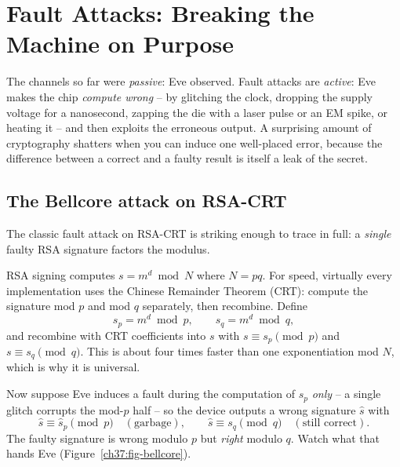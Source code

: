 \section{Fault Attacks: Breaking the Machine on Purpose}
\label{ch37:fault}

The channels so far were \emph{passive}: Eve observed. Fault attacks are \emph{active}: Eve makes the chip \emph{compute wrong} -- by glitching the clock, dropping the supply voltage for a nanosecond, zapping the die with a laser pulse or an EM spike, or heating it -- and then exploits the erroneous output. A surprising amount of cryptography shatters when you can induce one well-placed error, because the difference between a correct and a faulty result is itself a leak of the secret.

\subsection{The Bellcore attack on RSA-CRT}
\label{ch37:bellcore}

The classic fault attack on RSA-CRT is striking enough to trace in full: a \emph{single} faulty RSA signature factors the modulus.

RSA signing computes $s = m^{d} \bmod N$ where $N = pq$. For speed, virtually every implementation uses the Chinese Remainder Theorem (CRT): compute the signature mod $p$ and mod $q$ separately, then recombine. Define
\[
s_p = m^{d} \bmod p, \qquad s_q = m^{d} \bmod q,
\]
and recombine with CRT coefficients into $s$ with $s \equiv s_p \pmod p$ and $s \equiv s_q \pmod q$. This is about four times faster than one exponentiation mod $N$, which is why it is universal.

Now suppose Eve induces a fault during the computation of $s_p$ \emph{only} -- a single glitch corrupts the mod-$p$ half -- so the device outputs a wrong signature $\hat{s}$ with
\[
\hat{s} \equiv \hat{s}_p \pmod p \quad(\text{garbage}), \qquad \hat{s} \equiv s_q \pmod q \quad(\text{still correct}).
\]
The faulty signature is wrong modulo $p$ but \emph{right} modulo $q$. Watch what that hands Eve (Figure~\ref{ch37:fig-bellcore}).

